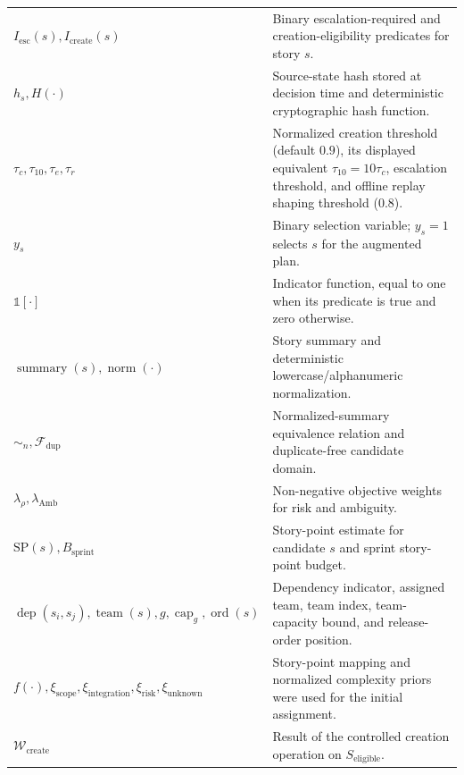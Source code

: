 \begin{longtable}{@{}>{\raggedright\arraybackslash}p{}>{\raggedright\arraybackslash}p{}@{}}
$I_{\mathrm{esc}}(s),I_{\mathrm{create}}(s)$ & Binary escalation-required and creation-eligibility predicates for story $s$. \\
$h_s,H(\cdot)$ & Source-state hash stored at decision time and deterministic cryptographic hash function. \\
$\tau_c,\tau_{10},\tau_e,\tau_r$ & Normalized creation threshold (default $0.9$), its displayed equivalent $\tau_{10}=10\tau_c$, escalation threshold, and offline replay shaping threshold ($0.8$). \\
$y_s$ & Binary selection variable; $y_s=1$ selects $s$ for the augmented plan. \\
$\mathbb{1}[\cdot]$ & Indicator function, equal to one when its predicate is true and zero otherwise. \\
$\operatorname{summary}(s),\operatorname{norm}(\cdot)$ & Story summary and deterministic lowercase/alphanumeric normalization. \\
$\sim_n,\mathcal{F}_{\mathrm{dup}}$ & Normalized-summary equivalence relation and duplicate-free candidate domain. \\
$\lambda_{\rho},\lambda_{\mathrm{Amb}}$ & Non-negative objective weights for risk and ambiguity. \\
$\mathrm{SP}(s),B_{\mathrm{sprint}}$ & Story-point estimate for candidate $s$ and sprint story-point budget. \\
$\operatorname{dep}(s_i,s_j),\operatorname{team}(s),g,\operatorname{cap}_g,\operatorname{ord}(s)$ & Dependency indicator, assigned team, team index, team-capacity bound, and release-order position. \\
$f(\cdot),\xi_{\mathrm{scope}},\xi_{\mathrm{integration}},\xi_{\mathrm{risk}},\xi_{\mathrm{unknown}}$ & Story-point mapping and normalized complexity priors were used for the initial assignment. \\
$\mathcal{W}_{\mathrm{create}}$ & Result of the controlled creation operation on $S_{\mathrm{eligible}}$. \\


\end{longtable}
